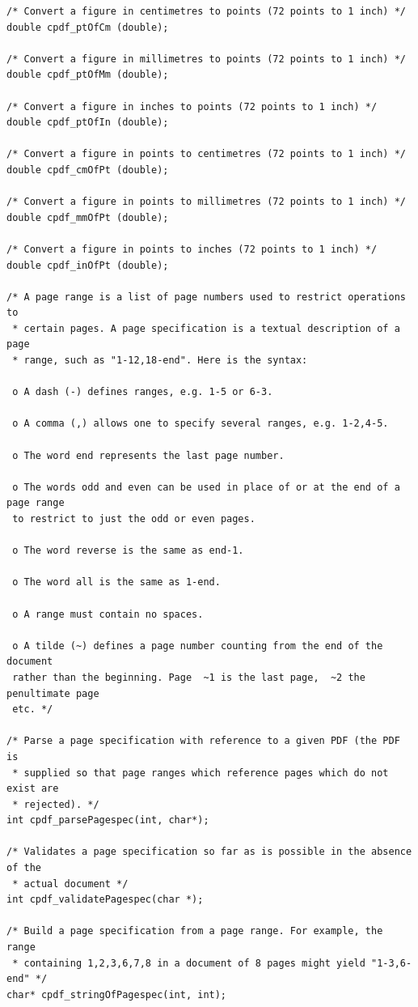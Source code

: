 \documentclass[a4paper]{memoir}
\begin{document}
\begin{small}
\begin{lstlisting}
/* Convert a figure in centimetres to points (72 points to 1 inch) */
double cpdf_ptOfCm (double);

/* Convert a figure in millimetres to points (72 points to 1 inch) */
double cpdf_ptOfMm (double);

/* Convert a figure in inches to points (72 points to 1 inch) */
double cpdf_ptOfIn (double);

/* Convert a figure in points to centimetres (72 points to 1 inch) */
double cpdf_cmOfPt (double);

/* Convert a figure in points to millimetres (72 points to 1 inch) */
double cpdf_mmOfPt (double);

/* Convert a figure in points to inches (72 points to 1 inch) */
double cpdf_inOfPt (double);

/* A page range is a list of page numbers used to restrict operations to
 * certain pages. A page specification is a textual description of a page
 * range, such as "1-12,18-end". Here is the syntax:

 o A dash (-) defines ranges, e.g. 1-5 or 6-3.

 o A comma (,) allows one to specify several ranges, e.g. 1-2,4-5.

 o The word end represents the last page number.

 o The words odd and even can be used in place of or at the end of a page range
 to restrict to just the odd or even pages.

 o The word reverse is the same as end-1.

 o The word all is the same as 1-end.

 o A range must contain no spaces.

 o A tilde (~) defines a page number counting from the end of the document
 rather than the beginning. Page  ~1 is the last page,  ~2 the penultimate page
 etc. */

/* Parse a page specification with reference to a given PDF (the PDF is
 * supplied so that page ranges which reference pages which do not exist are
 * rejected). */
int cpdf_parsePagespec(int, char*);

/* Validates a page specification so far as is possible in the absence of the
 * actual document */
int cpdf_validatePagespec(char *);

/* Build a page specification from a page range. For example, the range
 * containing 1,2,3,6,7,8 in a document of 8 pages might yield "1-3,6-end" */
char* cpdf_stringOfPagespec(int, int);


\end{lstlisting}
\end{small}
\end{document}
